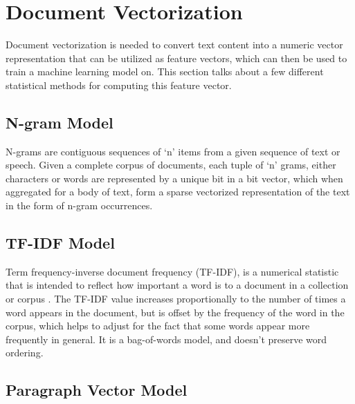 \documentclass[11pt,a4paper]{article}
\begin{document}




\section{Document Vectorization} %
\label{sec:document_vectorization}

  Document vectorization is needed to convert text content into a numeric vector representation that can be utilized as feature vectors, which can then be used to train a machine learning model on. This section talks about a few different statistical methods for computing this feature vector. \cite{SemEvalPaper}

  \subsection{N-gram Model} %
  \label{sub:n_gram_model}
    N-grams are contiguous sequences of `n' items from a given sequence of text or speech. Given a complete corpus of documents, each tuple of `n' grams, either characters or words are represented by a unique bit in a bit vector, which when aggregated for a body of text, form a sparse vectorized representation of the text in the form of n-gram occurrences.
  

  \subsection{TF-IDF Model} %
  \label{sub:tf_idf_model}
    Term frequency-inverse document frequency (TF-IDF), is a numerical statistic that is intended to reflect how important a word is to a document in a collection or corpus \cite{sparck1972statistical}. The TF-IDF value increases proportionally to the number of times a word appears in the document, but is offset by the frequency of the word in the corpus, which helps to adjust for the fact that some words appear more frequently in general. It is a bag-of-words model, and doesn't preserve word ordering.
  

  \subsection{Paragraph Vector Model} %
  \label{sub:paragraph_vectors_doc2vec}
\end{document}
